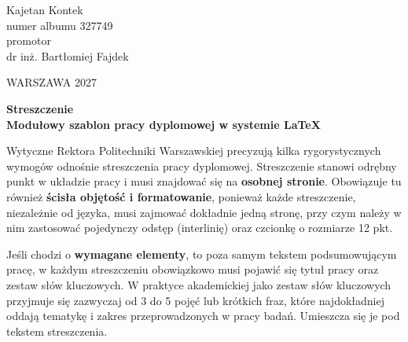 \documentclass[11pt, a4paper, twoside]{report}
\begin{document}
\begin{titlepage}
\begin{center}
			{\fontsize{21}{24}\selectfont Kajetan Kontek}\\[0.5cm]
			{\fontsize{12}{14}\selectfont numer albumu 327749}\\[1.5cm]
			
			{\fontsize{12}{14}\selectfont promotor}\\[0.5cm]
			{\fontsize{12}{14}\selectfont dr inż. Bartłomiej Fajdek}
			
			\vfill
			{\fontsize{12}{14}\selectfont WARSZAWA 2027}
		\end{center}
	\end{titlepage}
	
\clearpage\thispagestyle{empty}\mbox{}\clearpage


\clearpage %
\thispagestyle{plain} %

\begingroup
\fontsize{12pt}{14pt}\selectfont 

\begin{center}
	\textbf{Streszczenie} \\[0.5cm]
	\textbf{Modułowy szablon pracy dyplomowej w systemie \LaTeX{}}
\end{center}

\vspace{0.5cm}

\noindent Wytyczne Rektora Politechniki Warszawskiej precyzują kilka rygorystycznych wymogów odnośnie streszczenia pracy dyplomowej. Streszczenie stanowi odrębny punkt w układzie pracy i musi znajdować się na \textbf{osobnej stronie}. Obowiązuje tu również \textbf{ścisła objętość i formatowanie}, ponieważ każde streszczenie, niezależnie od języka, musi zajmować dokładnie jedną stronę, przy czym należy w nim zastosować pojedynczy odstęp (interlinię) oraz czcionkę o rozmiarze 12 pkt. 

Jeśli chodzi o \textbf{wymagane elementy}, to poza samym tekstem podsumowującym pracę, w każdym streszczeniu obowiązkowo musi pojawić się tytuł pracy oraz zestaw słów kluczowych. W praktyce akademickiej jako zestaw słów kluczowych przyjmuje się zazwyczaj od 3 do 5 pojęć lub krótkich fraz, które najdokładniej oddają tematykę i zakres przeprowadzonych w pracy badań. Umieszcza się je pod tekstem streszczenia.
\end{document}
